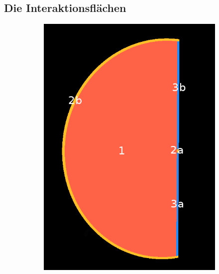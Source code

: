 \documentclass[a4paper,fontsize=12pt,toc=bib,halfparskip]{scrartcl}
\begin{document}
\subsection{Die Interaktionsfl\"achen}
\begin{figure}
	\hspace*{\fill}
	\begin{subfigure}{0.2\textwidth}
		\includegraphics[width=\textwidth]{pictures/InteractionPlane.png}
		\subcaption{}
		\label{InteractionPlaneA}
	\end{subfigure}
	\hfill
	\begin{subfigure}{0.165\textwidth}

\end{subfigure}
\end{figure}
\end{document}
